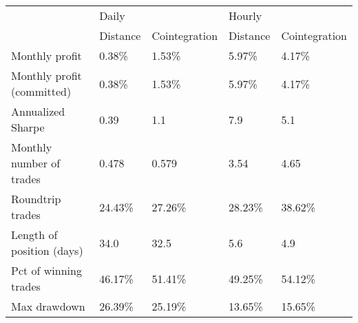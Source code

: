 \begin{tabular}{lllll}
\toprule
{} & \multicolumn{2}{l}{Daily} & \multicolumn{2}{l}{Hourly} \\
{} & Distance & Cointegration & Distance & Cointegration \\
\midrule
Monthly profit             &   0.38\% &        1.53\% &   5.97\% &        4.17\% \\
Monthly profit (committed) &   0.38\% &        1.53\% &   5.97\% &        4.17\% \\
Annualized Sharpe          &     0.39 &           1.1 &      7.9 &           5.1 \\
Monthly number of trades   &    0.478 &         0.579 &     3.54 &          4.65 \\
Roundtrip trades           &  24.43\% &       27.26\% &  28.23\% &       38.62\% \\
Length of position (days)  &     34.0 &          32.5 &      5.6 &           4.9 \\
Pct of winning trades      &  46.17\% &       51.41\% &  49.25\% &       54.12\% \\
Max drawdown               &  26.39\% &       25.19\% &  13.65\% &       15.65\% \\
\bottomrule
\end{tabular}
